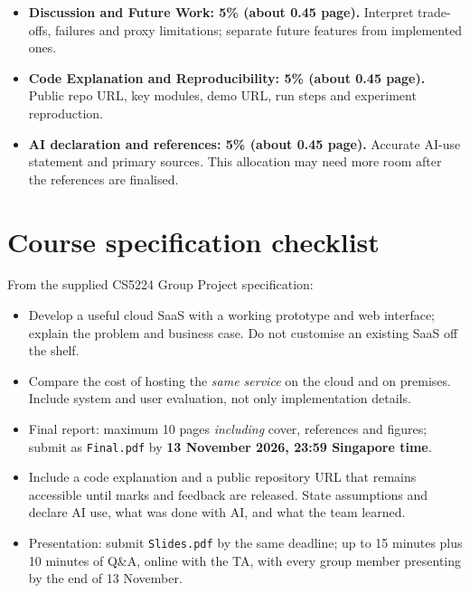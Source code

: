 \documentclass[11pt,a4paper]{article}
\begin{document}
\begin{itemize}
\begin{itemize}
    \end{itemize}
  \item \textbf{Discussion and Future Work: 5\% (about 0.45 page).} Interpret trade-offs, failures and proxy limitations; separate future features from implemented ones.
  \item \textbf{Code Explanation and Reproducibility: 5\% (about 0.45 page).} Public repo URL, key modules, demo URL, run steps and experiment reproduction.
  \item \textbf{AI declaration and references: 5\% (about 0.45 page).} Accurate AI-use statement and primary sources. This allocation may need more room after the references are finalised.
\end{itemize}

\section{Course specification checklist}
From the supplied CS5224 Group Project specification:
\begin{itemize}
  \item Develop a useful cloud SaaS with a working prototype and web interface; explain the problem and business case. Do not customise an existing SaaS off the shelf.
  \item Compare the cost of hosting the \emph{same service} on the cloud and on premises. Include system and user evaluation, not only implementation details.
  \item Final report: maximum 10 pages \emph{including} cover, references and figures; submit as \texttt{Final.pdf} by \textbf{13 November 2026, 23:59 Singapore time}.
  \item Include a code explanation and a public repository URL that remains accessible until marks and feedback are released. State assumptions and declare AI use, what was done with AI, and what the team learned.
  \item Presentation: submit \texttt{Slides.pdf} by the same deadline; up to 15 minutes plus 10 minutes of Q\&A, online with the TA, with every group member presenting by the end of 13 November.
\end{itemize}
\end{document}
